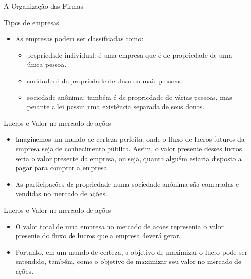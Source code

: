 \documentclass[aspectratio=169]{beamer}
\begin{document}
\begin{frame}{A Organização das Firmas}

\begin{block}{Tipos de empresas}

\begin{itemize}
    \item As empresas podem ser classificadas como:
    \begin{itemize}
    \item \alert{propriedade individual}: é uma empresa que é de propriedade de uma única pessoa.
    \item \alert{socidade}: é de propriedade de duas ou mais pessoas.
    \item \alert{sociedade anônima}: também é de propriedade de várias pessoas, mas perante a lei possui uma existência separada de seus donos.
    \end{itemize}

\end{itemize}


\end{block}
\end{frame}

\begin{frame}{Lucros e Valor no mercado de ações}

\begin{block}{ }

\begin{itemize}
    \item Imaginemos um mundo de certeza perfeita, onde o fluxo de lucros futuros da empresa seja de conhecimento público. Assim, o valor presente desses lucros seria o \alert{valor presente da empresa}, ou seja, quanto alguém estaria disposto a pagar para comprar a empresa.
    \item As participações de propriedade numa sociedade anônima são compradas e vendidas no \alert{mercado de ações}.
\end{itemize}

\end{block}
\end{frame}


\begin{frame}{Lucros e Valor no mercado de ações}

\begin{block}{ }

\begin{itemize}
    \item O valor total de uma empresa no mercado de ações representa o valor presente do fluxo de lucros que a empresa deverá gerar.
    \item Portanto, em um mundo de certeza, o objetivo de maximizar o lucro pode ser entendido, também, como o objetivo de maximizar seu valor no mercado de ações.
\end{itemize}

\end{block}
\end{frame}
\end{document}

